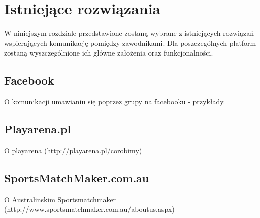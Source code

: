 \chapter{Istniejące rozwiązania}

W niniejszym rozdziale przedstawione zostaną wybrane z istniejących rozwiązań wspierających komunikację pomiędzy zawodnikami. Dla poszczególnych platform zostaną wyszczególnione ich główne założenia oraz funkcjonalności.


\section{Facebook}

O komunikacji umawianiu się poprzez grupy na facebooku - przykłady.

\section{Playarena.pl}

O playarena (http://playarena.pl/corobimy)

\section{SportsMatchMaker.com.au}

O Australinskim Sportsmatchmaker (http://www.sportsmatchmaker.com.au/aboutus.aspx)
